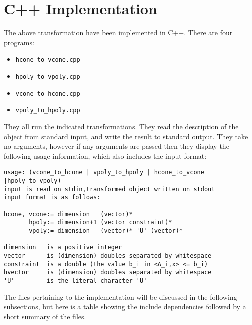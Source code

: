 \documentclass[fleqn]{article}
\newcommand{\0}{\vec{0}}
\begin{document}
\section{C++ Implementation}
The above transformation have been implemented in C++.  There are four programs:
\begin{itemize}
	\item \texttt{hcone\_to\_vcone.cpp}
	\item \texttt{hpoly\_to\_vpoly.cpp}
	\item \texttt{vcone\_to\_hcone.cpp}
	\item \texttt{vpoly\_to\_hpoly.cpp}
\end{itemize}
They all run the indicated transformations.  They read the description of the object from standard input, and write the result to standard output.  They take no arguments, however if any arguments are passed then they display the following usage information, which also includes the input format:
\begin{verbatim}
usage: (vcone_to_hcone | vpoly_to_hpoly | hcone_to_vcone |hpoly_to_vpoly)
input is read on stdin,transformed object written on stdout
input format is as follows:
 
hcone, vcone:= dimension   (vector)*
       hpoly:= dimension+1 (vector constraint)*
       vpoly:= dimension   (vector)* 'U' (vector)*

dimension   is a positive integer
vector      is (dimension) doubles separated by whitespace
constraint  is a double (the value b_i in <A_i,x> <= b_i)
hvector     is (dimension) doubles separated by whitespace
'U'         is the literal character 'U'
\end{verbatim}

The files pertaining to the implementation will be discussed in the following subsections, but here is a table showing the include dependencies followed by a short summary of the files. \\
\end{document}
